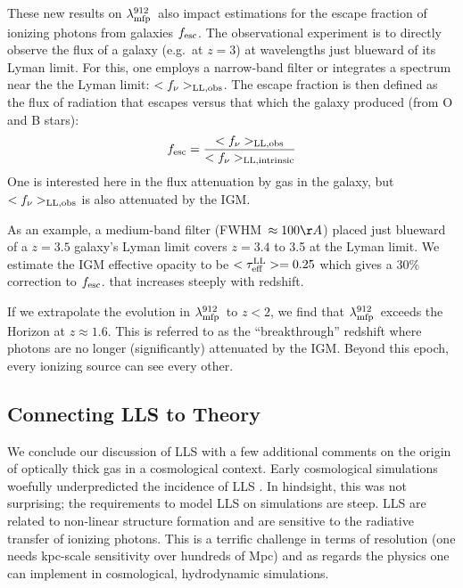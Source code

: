 \documentclass[graybox]{svmult}
\def\mlmfp{\lambda_{\rm mfp}^{912}}
\def\lmfp{$\mlmfp$}
\def\mtll{\tau_{\rm eff}^{\rm LL}}
\begin{document}
These new results on \lmfp\ also impact estimations for the escape fraction
of ionizing photons from galaxies $f_{\rm esc}$.
The observational experiment is to directly observe the flux
of a galaxy (e.g.\ at $z=3$) at wavelengths
just blueward of its Lyman limit.  For this, one employs
a narrow-band filter \cite[e.g.][]{nsk+13}
or integrates a spectrum near
the the Lyman limit: $<f_\nu>_{\rm LL,obs}$.
The escape fraction is then defined as the
flux of radiation that escapes
versus that which the galaxy produced (from O and B stars):
\begin{equation}
f_{\rm esc} = \frac{<f_\nu>_{\rm LL,obs}}{
<f_\nu>_{\rm LL,intrinsic}}
\end{equation}
One is interested here in the flux attenuation by gas in the galaxy,
but $<f_\nu>_{\rm LL,obs}$ is also attenuated by the IGM.

As an example, a medium-band filter (FWHM~$\approx 100\AA$)
placed just blueward of a $z=3.5$ galaxy's 
Lyman limit covers $z=3.4$ to 3.5 at the Lyman limit.
We estimate the IGM effective opacity to be $<\mtll> = 0.25$
which gives a 30\% correction to $f_{\rm esc}$.
that increases steeply with redshift.


If we extrapolate the evolution in \lmfp\ to $z<2$,
we find that \lmfp\ exceeds the Horizon at $z \approx 1.6$. 
This is referred to as the ``breakthrough'' redshift
where photons are no longer (significantly) attenuated
by the IGM.  Beyond this epoch, every ionizing source can 
see every other.


\subsection{Connecting LLS to Theory}
\label{sec:lls_theory}

We conclude our discussion of LLS with a few additional comments
on the origin of optically thick gas in a cosmological context.
Early cosmological simulations woefully underpredicted
the incidence of LLS \cite[]{gkh+01}.   In hindsight, this
was not surprising; the requirements to model LLS on simulations
are steep.
LLS are related to non-linear structure formation and
are sensitive to the radiative transfer of ionizing photons.
This is a terrific challenge in terms of resolution
(one needs kpc-scale sensitivity over hundreds of Mpc)
and as regards
the physics one can implement in cosmological, hydrodynamic
simulations.
\end{document}
